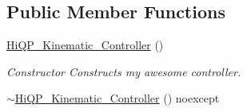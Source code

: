 \subsection*{Public Member Functions}
\begin{DoxyCompactItemize}
\item 
\hypertarget{classhiqp_1_1HiQP__Kinematic__Controller_aa82bda256000e7dc52fb4107bbdf62af}{\hyperlink{classhiqp_1_1HiQP__Kinematic__Controller_aa82bda256000e7dc52fb4107bbdf62af}{Hi\-Q\-P\-\_\-\-Kinematic\-\_\-\-Controller} ()}\label{classhiqp_1_1HiQP__Kinematic__Controller_aa82bda256000e7dc52fb4107bbdf62af}

\begin{DoxyCompactList}\small\item\em Constructor Constructs my awesome controller. \end{DoxyCompactList}\item 
\hypertarget{classhiqp_1_1HiQP__Kinematic__Controller_ae82482094e3e5eee72441b639fb63522}{\hyperlink{classhiqp_1_1HiQP__Kinematic__Controller_ae82482094e3e5eee72441b639fb63522}{$\sim$\-Hi\-Q\-P\-\_\-\-Kinematic\-\_\-\-Controller} () noexcept}\label{classhiqp_1_1HiQP__Kinematic__Controller_ae82482094e3e5eee72441b639fb63522}


\end{DoxyCompactItemize}
